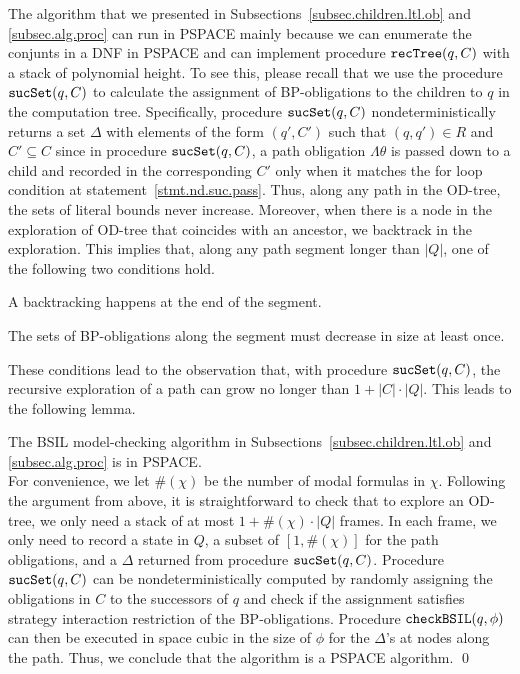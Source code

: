 The algorithm that we presented in
Subsections~\ref{subsec.children.ltl.ob} and \ref{subsec.alg.proc}
can run in PSPACE mainly because we can 
enumerate the conjunts in a DNF in PSPACE and can implement procedure
$\mbox{\tt recTree}(q,C)$ with a stack of polynomial height. 
To see this, please recall that we use the procedure
$\mbox{\tt sucSet}(q,C)$ to calculate the assignment of
BP-obligations to the children to $q$ in the computation tree. 
Specifically, procedure
$\mbox{\tt sucSet}(q,C)$ nondeterministically returns a
set $\Delta$ with elements of the form $(q',C')$ such that
$(q,q')\in R$ and $C'\subseteq C$ since \label{reply2.CpsubseteqC} 
in procedure $\mbox{\tt sucSet}(q,C)$, 
a path obligation $\Lambda\theta$ is passed down to a child and 
recorded in the corresponding $C'$ only when it 
matches the for loop condition at statement~\ref{stmt.nd.suc.pass}.  
Thus, along any path in the OD-tree, 
the sets of literal bounds never increase.  
Moreover, 
when there is a node in the exploration of OD-tree that coincides
with an ancestor, we backtrack in the exploration. This implies
that,
along any path segment longer than $|Q|$, one of the
following two conditions hold.
\begin{list1}
\item A backtracking happens at the end of the segment. 
\item The sets of BP-obligations along the segment must decrease in size at
	least once.
\end{list1}
These conditions lead to the observation that, with procedure
$\mbox{\tt sucSet}(q,C)$, the recursive exploration of
a path can grow no longer than $1+|C|\cdot|Q|$. This
leads to the following lemma.

{\lemma \label{lemma.alg.pspace} The BSIL model-checking algorithm
in Subsections~\ref{subsec.children.ltl.ob} and
\ref{subsec.alg.proc} is in PSPACE.}
\\\pf 
For convenience, we let 
$\#(\chi)$ be the number of modal formulas in $\chi$.  
Following the argument from above,
it is straightforward to check that to explore an OD-tree, we only
need a stack of at most $1+\#(\chi)\cdot|Q|$ frames. 
In each frame, we only need to record a state in $Q$, a subset of
$[1,\#(\chi)]$ for the path obligations, and a $\Delta$
returned from procedure $\mbox{\tt sucSet}(q,C)$.
Procedure $\mbox{\tt sucSet}(q,C)$ can be
nondeterministically computed by randomly assigning the
obligations in $C$ to the successors of $q$ and check if the
assignment satisfies strategy interaction restriction of 
the BP-obligations.
Procedure $\mbox{\tt checkBSIL}(q,\phi)$ can then be executed in space
cubic in the size of $\phi$ for the $\Delta$'s at nodes along the path. 
Thus, we conclude that the algorithm
is a PSPACE algorithm.  
\qed 



